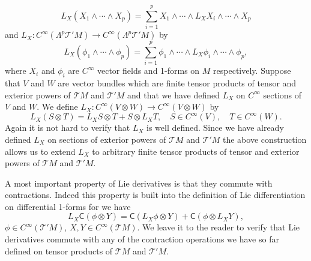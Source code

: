\[
L_X(X_1\wedge\cdots\wedge X_p)=\sum_{i=1}^p X_1\wedge\cdots\wedge L_XX_i\wedge\cdots\wedge X_p
\]
and $L_X:C^\infty(\Lambda^p\mathcal T'M)\to C^\infty(\Lambda^p\mathcal T'M)$ by
\[
L_X(\phi_1\wedge\cdots\wedge\phi_p)=\sum_{i=1}^p\phi_1\wedge\cdots\wedge L_X\phi_i\wedge\cdots\wedge\phi_p,
\]
where $X_i$ and $\phi_i$ are $C^\infty$ vector fields and 1-forms on $M$ respectively. Suppose that $V$ and $W$ are vector bundles which are finite tensor products of tensor and exterior powers of $\mathcal T M$ and $\mathcal T'M$ and that we have defined $L_X$ on $C^\infty$ sections of $V$ and $W$. We define $L_X:C^\infty(V\otimes W)\to C^\infty(V\otimes W)$ by
\[
L_X(S\otimes T)=L_XS\otimes T+S\otimes L_XT,\quad S\in C^\infty(V),\quad T\in C^\infty(W).
\]
Again it is not hard to verify that $L_X$ is well defined. Since we have already defined $L_X$ on sections of exterior powers of $\mathcal T M$ and $\mathcal T'M$ the above construction allows us to extend $L_X$ to arbitrary finite tensor products of tensor and exterior powers of $\mathcal T M$ and $\mathcal T'M$.

A most important property of Lie derivatives is that they commute with contractions. Indeed this property is built into the definition of Lie differentiation on differential 1-forms for we have
\[
L_X\mathsf C(\phi\otimes Y)=\mathsf C(L_X\phi\otimes Y)+\mathsf C(\phi\otimes L_XY),
\]
$\phi\in C^\infty(\mathcal T'M)$, $X,Y\in C^\infty(\mathcal T M)$. We leave it to the reader to verify that Lie derivatives commute with any of the contraction operations we have so far defined on tensor products of $\mathcal T M$ and $\mathcal T'M$.

